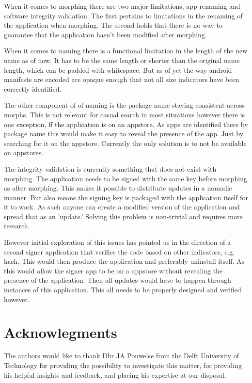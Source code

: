 \documentclass[twocolumn,english,compsoc,journal]{IEEEtran}
\begin{document}
When it comes to morphing there are two major limitations, app renaming
and software integrity validation. The first pertains to limitations in the renaming
of the application when morphing. The second holds that there is no way
to guarantee that the application hasn't been modified after morphing.

When it comes to naming there is a functional limitation in the length
of the new name as of now.
It has to be the same length or shorter than the original name length,
which can be padded with whitespace. But as of yet the way android
manifests are encoded are opaque enough that not all size indicators
have been correctly identified.

The other component of of naming is the package name staying consistent
across morphs. This is not relevant for casual search in most situations
however there is one exception, ff the application is on an appstore. As
apps are identified there by package name this would make it easy to
reveal the presence of the app. Just by searching for it on the appstore.
Currently the only solution is to not be available on appstores.

The integrity validation is currently something that does not exist with
morphing. The application needs to be signed with the same key
before morphing as after morphing. This makes it possible to distribute
updates in a nomadic manner. But also means the signing key is packaged
with the application itself for it to work. As such anyone can create a
modified version of the application and spread that as an 'update.'
Solving this problem is non-trivial and requires more research.

However initial exploration of this issues has pointed us in the direction
of a second signer application that verifies the code based on other
indicators, e.g. hash. This would then produce the application and
preferably uninstall itself. As this would allow the signer app to be
on a appstore without revealing the presence of the application. Then 
all updates would have to happen through instances of this application.
This all needs to be properly designed and verified however.

\section*{Acknowlegments}

The authors would like to thank Dhr JA Pouwelse from the Delft University of Technology for providing the possibility to investigate this matter, for providing his helpful insights and feedback, and placing his expertise at our disposal.



\end{document}
